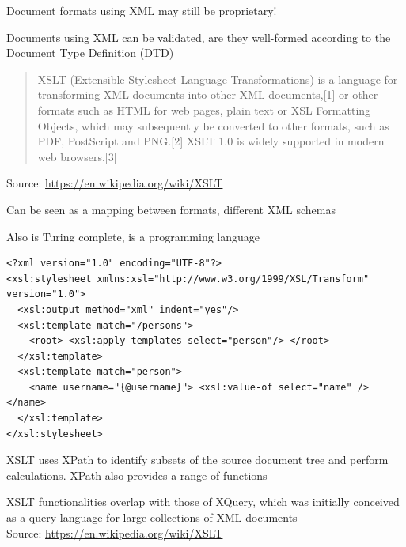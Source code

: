 \documentclass[Screen16to9,17pt]{foils}
\begin{document}
\begin{list2}
\item Document formats using XML may still be proprietary!
\item Documents using XML can be validated, are they well-formed according to the Document Type Definition (DTD)
\end{list2}

\begin{quote}


XSLT (Extensible Stylesheet Language Transformations) is a language for transforming XML documents into other XML documents,[1] or other formats such as HTML for web pages, plain text or XSL Formatting Objects, which may subsequently be converted to other formats, such as PDF, PostScript and PNG.[2] XSLT 1.0 is widely supported in modern web browsers.[3]
\end{quote}
Source: \url{https://en.wikipedia.org/wiki/XSLT}

\begin{list2}
\item Can be seen as a mapping between formats, different XML schemas
\item Also is Turing complete, is a programming language
\end{list2}


\begin{verbatim}
<?xml version="1.0" encoding="UTF-8"?>
<xsl:stylesheet xmlns:xsl="http://www.w3.org/1999/XSL/Transform" version="1.0">
  <xsl:output method="xml" indent="yes"/>
  <xsl:template match="/persons">
    <root> <xsl:apply-templates select="person"/> </root>
  </xsl:template>
  <xsl:template match="person">
    <name username="{@username}"> <xsl:value-of select="name" /> </name>
  </xsl:template>
</xsl:stylesheet>
\end{verbatim}

\begin{list2}
\item XSLT uses XPath to identify subsets of the source document tree and perform calculations. XPath also provides a range of functions
\item XSLT functionalities overlap with those of XQuery, which was initially conceived as a query language for large collections of XML documents\\
Source: \url{https://en.wikipedia.org/wiki/XSLT}
\end{list2}
\end{document}
